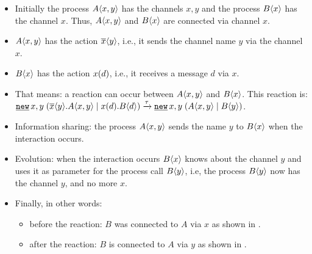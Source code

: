 \begin{itemize}
\item Initially the process $A\langle x,y\rangle$ has the channels $x,y$ and the process $B\langle x\rangle$ has the channel $x$. Thus, $A\langle x,y\rangle$ and $B\langle x\rangle$ are connected via channel $x$.
\item $A\langle x,y\rangle$ has the action $\overline{x}\langle{y}\rangle$, i.e., it sends the channel name $y$ via the channel $x$.
\item $B\langle x\rangle$ has the action $x({d})$, i.e., it receives a message $d$ via $x$.
\item That means: a reaction can occur between $A\langle x,y\rangle$ and $B\langle x\rangle$. This reaction is: $\procres{x,y}{(\procpar{\out{x}{{y}}.\proccall{A}{x,y}}{\inp{x}{{d}}.\proccall{B}{d}})} \transs{\tau} \procres{x,y}{(\procpar{\proccall{A}{x,y}}{\proccall{B}{y}})}$.
\item Information sharing: the process $A\langle x,y\rangle$ sends the name $y$ to $B\langle x\rangle$ when the interaction occurs.
\item Evolution: when the interaction occurs $B\langle x\rangle$ knows about the channel $y$ and uses it as parameter for the process call $B\langle y\rangle$, i.e, the process $B\langle y\rangle$ now has the channel $y$, and no more $x$.
\item Finally, in other words: 
\begin{itemize}
\item before the reaction: $B$ was connected to $A$ via $x$ as shown in .
\item after the reaction: $B$ is connected to $A$ via $y$ as shown in .
\end{itemize}
\end{itemize}

